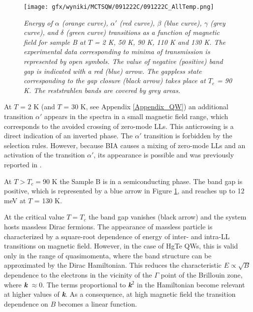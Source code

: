 \documentclass[titlepage,a4paper]{book}
\begin{document}
\begin{figure}[ht]
	\centering
	\texttt{[image: gfx/wyniki/MCTSQW/091222C/091222C\_AllTemp.png]}
	\vspace{-10pt}
	\caption{\textit{Energy of $\alpha$ (orange curve), $\alpha'$ (red curve), $\beta$ (blue curve), $\gamma$ (grey curve), and $\delta$ (green curve) transitions as a function of magnetic field for sample B at $T$ = 2 K, 50 K, 90 K, 110 K and 130 K. The experimental data corresponding to minima of transmission is represented by open symbols. The value of negative (positive) band gap is indicated with a red (blue) arrow. The gappless state corresponding to the gap closure (black arrow) takes place at $T_c$ = 90 K. The reststrahlen bands are covered by grey areas.}}
	\label{fig:091222C_AllTemp}
\end{figure}

At $T$ = 2 K (and $T$ = 30 K, see Appendix \ref{Appendix_QW}) an additional transition $\alpha'$ appears in the spectra in a small magnetic field range, which corresponds to the avoided crossing of zero-mode LLs. This anticrossing is a direct indication of an inverted phase. The $\alpha'$ transition is forbidden by the selection rules. However, because BIA causes a mixing of zero-mode LLs and an activation of the transition $\alpha'$, its appearance is possible and was previously reported in \cite{Orlita_MCT_QW}\cite{Zholudev_MCT_QW}\cite{Zholudev_MCT_QW_anticrossing}.

At $T > T_c = 90$ K the Sample B is in a semiconducting phase. The band gap is positive, which is represented by a blue arrow in Figure \ref{fig:091222C_AllTemp}, and reaches up to 12 meV at $T$ = 130 K. 

At the critical value $T = T_c$ the band gap vanishes (black arrow) and the system hosts massless Dirac fermions. The appearance of massless particle is characterized by a square-root dependence of energy of inter- and intra-LL transitions on magnetic field. However, in the case of HgTe QWs, this is valid only in the range of quasimomenta, where the band structure can be approximated by the Dirac Hamiltonian. This reduces the characteristic $E \propto \sqrt{B}$ dependence to the electrons in the vicinity of the $\Gamma$ point of the Brillouin zone, where \textbf{\textit{k}} $\approx 0$. The terms proportional to \textbf{\textit{k}}$^2$ in the Hamiltonian become relevant at higher values of \textbf{\textit{k}}. As a consequence, at high magnetic field the transition dependence on $B$ becomes a linear function. 
\end{document}
